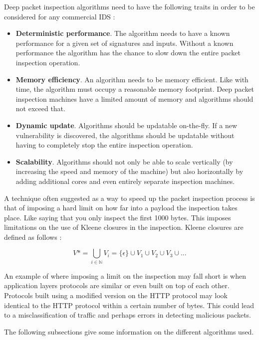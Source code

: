 \documentclass{article}
\begin{document}
Deep packet inspection algorithms need to have the following traits in order to be considered for any commercial IDS \citep{AbuHmed2007}:
\begin{itemize}
  \item \textbf{Deterministic performance}. The algorithm needs to have a known performance for a given set of signatures and inputs. Without a known performance the algorithm has the chance to slow down the entire packet inspection operation.
  \item \textbf{Memory efficiency}. An algorithm needs to be memory efficient. Like with time, the algorithm must occupy a reasonable memory footprint. Deep packet inspection machines have a limited amount of memory and algorithms should not exceed that.
  \item \textbf{Dynamic update}. Algorithms should be updatable on-the-fly. If a new vulnerability is discovered, the algorithms should be updatable without having to completely stop the entire inspection operation.
  \item \textbf{Scalability}. Algorithms should not only be able to scale vertically (by increasing the speed and memory of the machine) but also horizontally by adding additional cores and even entirely separate inspection machines. 
\end{itemize}

A technique often suggested as a way to speed up the packet inspection process is that of imposing a hard limit on how far into a payload the inspection takes place. Like saying that you only inspect the first 1000 bytes. This imposes limitations on the use of Kleene closures in the inspection. Kleene closures are defined as follows \citep{Lee1969}:

\begin{displaymath}
  V* =  \bigcup _{i \in \mathbb{N}} V_i = \{\epsilon\} \cup V_1 \cup V_2 \cup V_3 \cup ...
  \label{math:kleene}
\end{displaymath}

An example of where imposing a limit on the inspection may fall short is when application layers protocols are similar or even built on top of each other. Protocols built using a modified version on the HTTP protocol may look identical to the HTTP protocol within a certain number of bytes. This could lead to a misclassification of traffic and perhaps errors in detecting malicious packets.

The following subsections give some information on the different algorithms used. 
\end{document}
